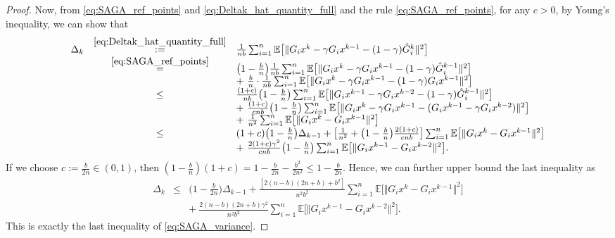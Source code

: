 \documentclass{article}
\newcommand{\norms}[1]{\Vert#1\Vert}
\newcommand{\Eproof}{\hfill $\square$}
\newcommand{\Expk}[1]{\mathbb{E}\big[#1\big]}
\theoremstyle{plain}
\theoremstyle{definition}
\theoremstyle{remark}
\begin{document}
\begin{proof}
Now, from \eqref{eq:SAGA_ref_points} and \eqref{eq:Deltak_hat_quantity_full} and the rule \eqref{eq:SAGA_ref_points}, for any $c > 0$, by Young's inequality, we can show that
\begin{equation*}
\begin{array}{lcl}
\Delta_k & \overset{\eqref{eq:Deltak_hat_quantity_full}}{ := } &  \frac{1}{n b}  \sum_{i = 1}^n \Expk{  \norms{  G_ix^k - \gamma G_ix^{k-1} - (1-\gamma)\hat{G}_i^k }^2 } \\
& \overset{ \eqref{eq:SAGA_ref_points} }{ = } & \big(1 - \frac{b}{n}\big)  \frac{1}{n b}  \sum_{i = 1}^n \Expk{  \norms{  G_ix^k - \gamma G_ix^{k-1} - (1-\gamma)\hat{G}_i^{k-1} }^2 } \\
&& + {~}  \frac{b}{n} \cdot  \frac{1}{n b}  \sum_{i = 1}^n \Expk{  \norms{  G_ix^k - \gamma G_ix^{k-1} - (1-\gamma) G_ix^{k-1} }^2 } \\
& \leq &   \frac{(1+c)}{ n b} \big(1 - \frac{b}{n}\big)  \sum_{i = 1}^n \Expk{  \norms{  G_ix^{k-1} - \gamma G_ix^{k-2} - (1-\gamma) \hat{G}_i^{k-1} }^2 } \\
&& + {~} \frac{(1 + c)}{c n b}\big(1 - \frac{b}{n}\big)  \sum_{i = 1}^n \Expk{  \norms{  G_ix^k - \gamma G_ix^{k-1} - ( G_ix^{k-1} -  \gamma G_ix^{k-2}) }^2 } \\
&& + {~}  \frac{1}{n^2}   \sum_{i = 1}^n \Expk{  \norms{  G_ix^k -  G_ix^{k-1} }^2 } \\
&  \leq  &  (1 + c) \big(1 - \frac{b}{n}\big) \Delta_{k-1} + \big[ \frac{1}{n^2} + \big(1 - \frac{b}{n}\big)\frac{2(1+c)}{c n b} \big]  \sum_{i = 1}^n \Expk{  \norms{  G_ix^k - G_ix^{k-1} }^2  } \\
&& +  {~} \frac{2(1+c)\gamma^2}{c n b} \big(1 - \frac{b}{n}\big)  \sum_{i = 1}^n \Expk{ \norms{  G_ix^{k-1} - G_ix^{k-2}  }^2 }.
\end{array}
\end{equation*}
If we choose $c := \frac{b}{2n} \in (0, 1)$, then $(1 - \frac{b}{n})(1+c) = 1 - \frac{b}{2n} - \frac{b^2}{2n^2} \leq 1 - \frac{b}{2n}$.
Hence,  we can further upper bound the last inequality as 
\begin{equation*}
\begin{array}{lcl}
\Delta_k & \leq &  \big(1 -  \frac{b}{2n} \big)  \Delta_{k-1}  +   \frac{[ 2(n - b)(2n + b) +  b^2] }{ n^2 b^2 } \sum_{i=1}^n \Expk{ \norms{G_ix^k - G_ix^{k-1}}^2 } \\
&& + {~}  \frac{2(n - b)(2n + b) \gamma^2 }{ n^2b^2  } \sum_{i=1}^n \Expk{ \norms{G_ix^{k-1} - G_ix^{k-2} }^2 }.
\end{array}
\end{equation*}
This is exactly the last inequality of  \eqref{eq:SAGA_variance}.
\end{proof}
\end{document}
